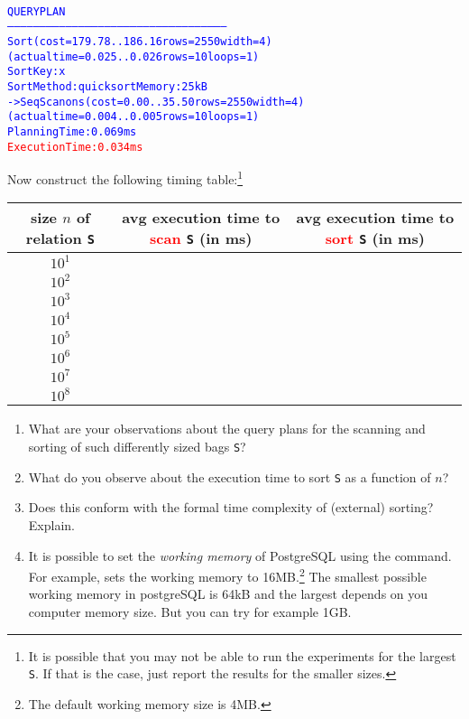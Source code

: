 \documentclass{article}
\newcommand{\blue}[1]{{\color{blue}#1}}
\begin{document}
\begin{enumerate}[resume]
\begin{center}
{\footnotesize
\begin{alltt}
\textcolor{blue}{
    QUERY PLAN                                              
------------------------------------------------------------------------------------------------------
 Sort  (cost=179.78..186.16 rows=2550 width=4) (actual time=0.025..0.026 rows=10 loops=1)
   Sort Key: x
   Sort Method: quicksort  Memory: 25kB
   ->  Seq Scan on s  (cost=0.00..35.50 rows=2550 width=4) (actual time=0.004..0.005 rows=10 loops=1)
 Planning Time: 0.069 ms
 \textcolor{red}{Execution Time: 0.034 ms}}
\end{alltt}
}
\end{center}

Now construct the following timing table:\footnote{It is possible that you may not be able to run the experiments for the largest {\tt S}.   If that is the case, just report the results for the smaller sizes.}
\begin{center}
\begin{tabular}{c|c|c}
size $n$ of relation {\tt S} & avg execution time to \textcolor{red}{scan} {\tt S} (in ms) &avg execution time to \textcolor{red}{sort} {\tt S} (in ms) \\ \hline
$10^1$ & & \\
$10^2$ & & \\
$10^3$ &  & \\
$10^4$ & & \\
$10^5$ &  & \\
$10^6$ &  & \\
$10^7$ & & \\
$10^8$ &  & \\
\end{tabular}
\end{center}

\begin{enumerate}
\item\label{sortTimea} What are your observations about the query plans for the scanning and sorting of such differently sized bags {\tt S}?
\item What do you observe about the execution time to sort {\tt S} as a function of $n$?
\item Does this conform with the formal time complexity of (external) sorting?  Explain.
\item It is possible to set the \emph{working memory} of PostgreSQL using the \blue{{\tt set work\_mem}}
command.   For example, \blue{{\tt set work\_mem = '16MB'}} sets the working memory to 16MB.\footnote{The default working memory size is 4MB.}   The smallest possible working memory in postgreSQL is 64kB and the largest depends on you computer memory size.   But you can try for example 1GB.


\end{enumerate}
\end{enumerate}
\end{document}
